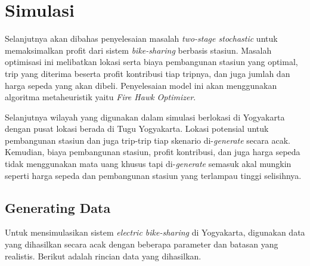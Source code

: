 \section{Simulasi}

Selanjutnya akan dibahas penyelesaian masalah \textit{two-stage stochastic} untuk memaksimalkan profit dari sistem \textit{bike-sharing} berbasis stasiun. Masalah optimisasi ini melibatkan lokasi serta biaya pembangunan stasiun yang optimal, trip yang diterima beserta profit kontribusi tiap tripnya, dan juga jumlah dan harga sepeda yang akan dibeli. Penyelesaian model ini akan menggunakan algoritma metaheuristik yaitu \textit{Fire Hawk Optimizer}.

Selanjutnya wilayah yang digunakan dalam simulasi berlokasi di Yogyakarta dengan pusat lokasi berada di Tugu Yogyakarta. Lokasi potensial untuk pembangunan stasiun dan juga trip-trip tiap skenario di-\textit{generate} secara acak. Kemudian, biaya pembangunan stasiun, profit kontribusi, dan juga harga sepeda tidak menggunakan mata uang khusus tapi di-\textit{generate} semasuk akal mungkin seperti harga sepeda dan pembangunan stasiun yang terlampau tinggi selisihnya.

\subsection{Generating Data}
Untuk mensimulasikan sistem \textit{electric bike-sharing} di Yogyakarta, digunakan data yang dihasilkan secara acak dengan beberapa parameter dan batasan yang realistis. Berikut adalah rincian data yang dihasilkan.

